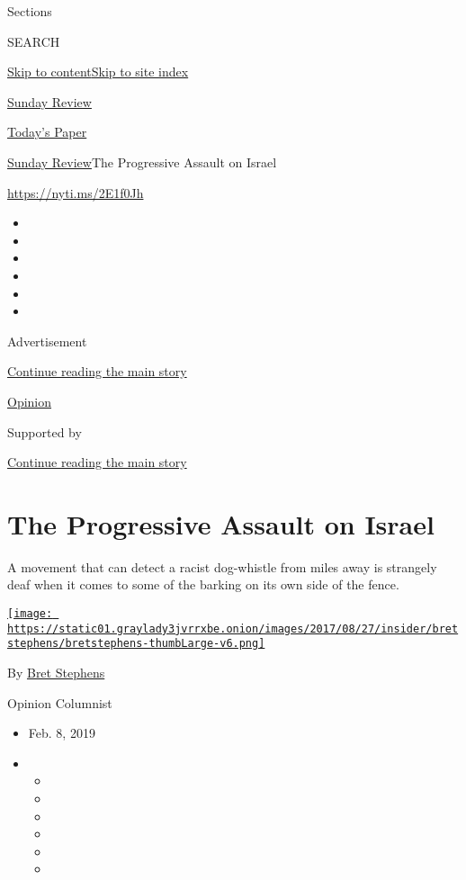 Sections

SEARCH

\protect\hyperlink{site-content}{Skip to
content}\protect\hyperlink{site-index}{Skip to site index}

\href{https://www.nytimes3xbfgragh.onion/section/opinion/sunday}{Sunday
Review}

\href{https://myaccount.nytimes3xbfgragh.onion/auth/login?response_type=cookie\&client_id=vi}{}

\href{https://www.nytimes3xbfgragh.onion/section/todayspaper}{Today's
Paper}

\href{/section/opinion/sunday}{Sunday Review}\textbar{}The Progressive
Assault on Israel

\url{https://nyti.ms/2E1f0Jh}

\begin{itemize}
\item
\item
\item
\item
\item
\item
\end{itemize}

Advertisement

\protect\hyperlink{after-top}{Continue reading the main story}

\href{/section/opinion}{Opinion}

Supported by

\protect\hyperlink{after-sponsor}{Continue reading the main story}

\hypertarget{the-progressive-assault-on-israel}{%
\section{The Progressive Assault on
Israel}\label{the-progressive-assault-on-israel}}

A movement that can detect a racist dog-whistle from miles away is
strangely deaf when it comes to some of the barking on its own side of
the fence.

\href{https://www.nytimes3xbfgragh.onion/by/bret-stephens}{\texttt{[image: https://static01.graylady3jvrrxbe.onion/images/2017/08/27/insider/bretstephens/bretstephens-thumbLarge-v6.png]}}

By \href{https://www.nytimes3xbfgragh.onion/by/bret-stephens}{Bret
Stephens}

Opinion Columnist

\begin{itemize}
\item
  Feb. 8, 2019
\item
  \begin{itemize}
  \item
  \item
  \item
  \item
  \item
  \item
  \end{itemize}
\end{itemize}

